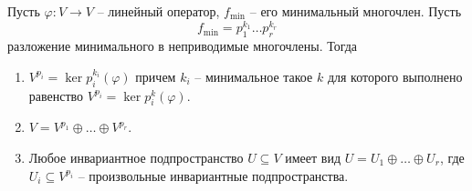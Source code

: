 \begin{claim}
\label{claim::GenRootDec}
Пусть $\varphi\colon V\to V$ -- линейный оператор, $f_\text{min}$ -- его минимальный многочлен.
Пусть
\[
f_\text{min} = p_1^{k_1} \ldots p_r^{k_r}
\]
разложение минимального в неприводимые многочлены.
Тогда
\begin{enumerate}
\item  $V^{p_i} = \ker p_i^{k_i}(\varphi)$ причем $k_i$ -- минимальное такое $k$ для которого выполнено равенство $V^{p_i} = \ker p_i^{k}(\varphi)$.

\item $V = V^{p_1}\oplus \ldots \oplus V^{p_r}$.

\item Любое инвариантное подпространство $U\subseteq V$ имеет вид $U = U_1\oplus \ldots \oplus U_r$, где $U_i \subseteq V^{p_i}$ -- произвольные инвариантные подпространства.
\end{enumerate}
\end{claim}
